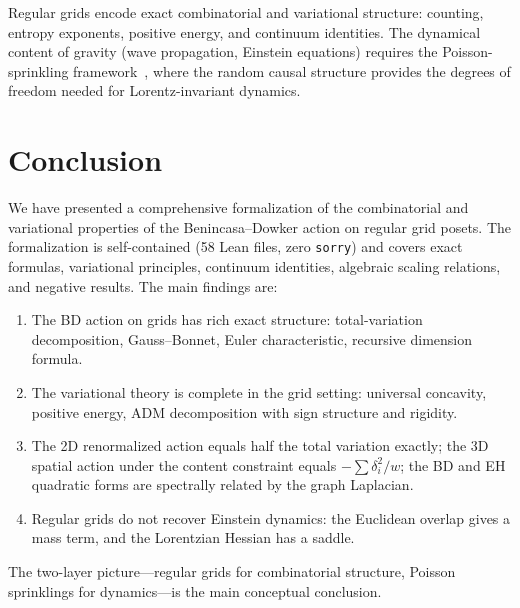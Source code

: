 \documentclass[11pt,a4paper]{article}
\theoremstyle{remark}
\begin{document}
Regular grids encode exact combinatorial and variational structure: counting,
entropy exponents, positive energy, and continuum identities.
The dynamical content of gravity (wave propagation, Einstein equations)
requires the Poisson-sprinkling framework~\cite{BD2010,Dowker2013,Surya2019},
where the random causal structure provides the degrees of freedom needed
for Lorentz-invariant dynamics.

\section{Conclusion}

We have presented a comprehensive formalization of the combinatorial and variational
properties of the Benincasa--Dowker action on regular grid posets. The formalization
is self-contained (58 Lean files, zero \texttt{sorry}) and covers exact formulas,
variational principles, continuum identities, algebraic scaling relations, and
negative results. The main findings are:

\begin{enumerate}
\item The BD action on grids has rich exact structure: total-variation decomposition,
  Gauss--Bonnet, Euler characteristic, recursive dimension formula.
\item The variational theory is complete in the grid setting: universal concavity,
  positive energy, ADM decomposition with sign structure and rigidity.
\item The 2D renormalized action equals half the total variation exactly;
  the 3D spatial action under the content constraint equals $-\sum\delta_i^2/w$;
  the BD and EH quadratic forms are spectrally related by the graph Laplacian.
\item Regular grids do not recover Einstein dynamics: the Euclidean overlap gives
  a mass term, and the Lorentzian Hessian has a saddle.
\end{enumerate}

The two-layer picture---regular grids for combinatorial structure, Poisson sprinklings
for dynamics---is the main conceptual conclusion.
\end{document}
